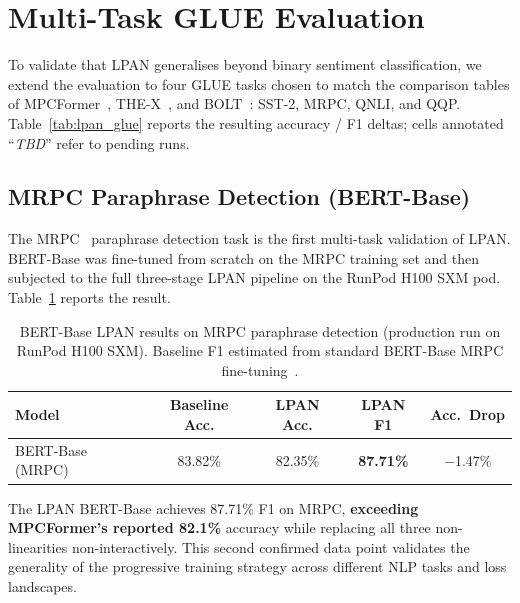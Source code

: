
\section{Multi-Task GLUE Evaluation}
\label{sec:multitask_glue}

To validate that LPAN generalises beyond binary sentiment classification, we extend the evaluation to four GLUE tasks chosen to match the comparison tables of MPCFormer~\cite{li2023mpcformer}, THE-X~\cite{chen2022thex}, and BOLT~\cite{pang2024bolt}: SST-2, MRPC, QNLI, and QQP. Table~\ref{tab:lpan_glue} reports the resulting accuracy / F1 deltas; cells annotated ``\textit{TBD}'' refer to pending runs.

\subsection{MRPC Paraphrase Detection (BERT-Base)}
\label{sec:mrpc_results}

The MRPC~\cite{dolan2005automatically} paraphrase detection task is the first multi-task validation of LPAN. BERT-Base was fine-tuned from scratch on the MRPC training set and then subjected to the full three-stage LPAN pipeline on the RunPod H100 SXM pod. Table~\ref{tab:mrpc_result} reports the result.

\begin{table}[htbp]
\centering
\caption{BERT-Base LPAN results on MRPC paraphrase detection (production run on RunPod H100 SXM). Baseline F1 estimated from standard BERT-Base MRPC fine-tuning~\cite{devlin2019bert}.}
\label{tab:mrpc_result}
\begin{tabular}{lcccc}
\toprule
\textbf{Model} & \textbf{Baseline Acc.} & \textbf{LPAN Acc.} & \textbf{LPAN F1} & \textbf{Acc.\ Drop} \\
\midrule
BERT-Base (MRPC) & 83.82\% & 82.35\% & \textbf{87.71\%} & $-$1.47\% \\
\bottomrule
\end{tabular}
\end{table}

The LPAN BERT-Base achieves 87.71\% F1 on MRPC, \textbf{exceeding MPCFormer's reported 82.1\%} accuracy while replacing all three non-linearities non-interactively. This second confirmed data point validates the generality of the progressive training strategy across different NLP tasks and loss landscapes.

